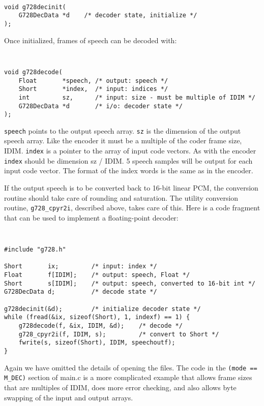 {\tt\small
\begin{verbatim}
void g728decinit(
    G728DecData *d    /* decoder state, initialize */
);
\end{verbatim}
}

Once initialized, frames of speech can be decoded with:

{\tt\small
\begin{verbatim}
void g728decode(
    Float       *speech, /* output: speech */
    Short       *index,  /* input: indices */
    int         sz,      /* input: size - must be multiple of IDIM */
    G728DecData *d       /* i/o: decoder state */	
);
\end{verbatim}
}

{\tt speech} points to the output speech array.
{\tt sz} is the dimension of the output speech array.
Like the encoder it must be
a multiple of the coder frame size, IDIM.
{\tt index} is a pointer to the array of input code vectors.
As with the encoder {\tt index} should be dimension sz / IDIM.
5 speech samples will be output for each input code vector.
The format of the index words is the same as in the encoder.

If the output speech is to be converted back to 16-bit linear PCM, the
conversion routine should take care of rounding and saturation.
The utility conversion routine, {\tt g728\_cpyr2i}, described above,
takes care of this. Here is a code fragment that can be used
to implement a floating-point decoder:

{\tt\small
\begin{verbatim}
#include "g728.h"

Short       ix;         /* input: index */
Float       f[IDIM];    /* output: speech, Float */
Short       s[IDIM];    /* output: speech, converted to 16-bit int */
G728DecData d;          /* decode state */

g728decinit(&d);        /* initialize decoder state */
while (fread(&ix, sizeof(Short), 1, indexf) == 1) {
    g728decode(f, &ix, IDIM, &d);    /* decode */
    g728_cpyr2i(f, IDIM, s);         /* convert to Short */
    fwrite(s, sizeof(Short), IDIM, speechoutf);
}
\end{verbatim}
}

Again we have omitted the details of opening the files.
The code in the {\tt (mode == M\_DEC)} section of main.c is a more
complicated example that allows frame sizes that are multiples of IDIM,
does more error checking, and also allows byte swapping of the input
and output arrays.

